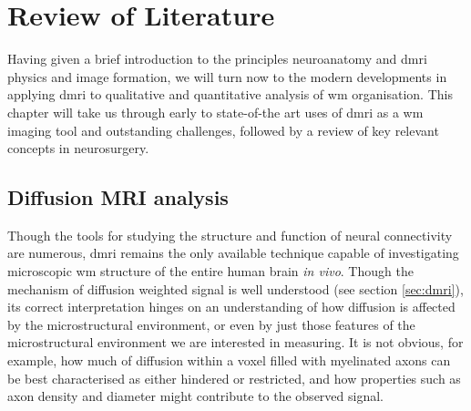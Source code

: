 \chapter{Review of Literature}
\label{review}

Having given a brief introduction to the principles neuroanatomy and \gls{dmri} physics and image formation, we will turn now to the modern developments in applying \gls{dmri} to qualitative and quantitative analysis of \gls{wm} organisation.
This chapter will take us through early to state-of-the art uses of \gls{dmri} as a \gls{wm} imaging tool and outstanding challenges, followed by a review of key relevant concepts in neurosurgery.

\section{Diffusion MRI analysis}

Though the tools for studying the structure and function of neural connectivity are numerous, \gls{dmri} remains the only available technique capable of investigating microscopic \gls{wm} structure of the entire human brain \textit{in vivo}.
Though the mechanism of diffusion weighted signal is well understood (see section \ref{sec:dmri}), its correct interpretation hinges on an understanding of how diffusion is affected by the microstructural environment\autocite{LeBihan1995}, or even by just those features of the microstructural environment we are interested in measuring.
It is not obvious, for example, how much of diffusion within a voxel filled with myelinated axons can be best characterised as either hindered or restricted, and how properties such as axon density and diameter might contribute to the observed signal.\autocite{Panagiotaki2012}

